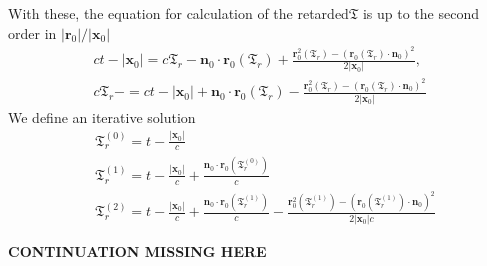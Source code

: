With these, the equation for calculation of the retarded${\mathfrak T}$ is up to the second order in $|{\bm r_0}|/|{\bm x}_0|$
\begin{align}
    ct - |{\bm x}_0| = c{\mathfrak T}_r - {\bm n}_0\cdot{\bm r_0}({\mathfrak T}_r)+\frac{{\bm r}_0^2({\mathfrak T}_r)-({\bm r}_0({\mathfrak T}_r)\cdot{\bm n}_0)^2}{2|{\bm x}_0|},\nonumber \\
    c{\mathfrak T}_r -=ct - |{\bm x}_0| + {\bm n}_0\cdot{\bm r_0}({\mathfrak T}_r)-\frac{{\bm r}_0^2({\mathfrak T}_r)-({\bm r}_0({\mathfrak T}_r)\cdot{\bm n}_0)^2}{2|{\bm x}_0|}
\end{align}
We define an iterative solution
\begin{align}
     & {\mathfrak T}_r^{(0)} =t -\frac{|{\bm x}_0|}{c}                                                                                                                                                                    \\
     & {\mathfrak T}_r^{(1)} = t-\frac{|{\bm x}_0|}c+\frac{{\bm n}_0\cdot{\bm r}_0({\mathfrak T}_r^{(0)})}{c}                                                                                                             \\
     & {\mathfrak T}_r^{(2)} = t-\frac{|{\bm x}_0|}c+\frac{{\bm n}_0\cdot{\bm r}_0({\mathfrak T}_r^{(1)})}{c}-\frac{{\bm r}_0^2({\mathfrak T}_r^{(1)})-({\bm r}_0({\mathfrak T}_r^{(1)})\cdot{\bm n}_0)^2}{2|{\bm x}_0|c}
\end{align}

{\bf{\color{red} CONTINUATION MISSING HERE}}
